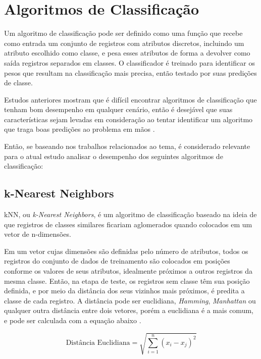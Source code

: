 \section{Algoritmos de Classificação}
\label{sec:algoritmos}

Um algoritmo de classificação pode ser definido como uma função que recebe como entrada um conjunto de registros com atributos discretos, incluindo um atributo escolhido como classe, e pesa esses atributos de forma a devolver como saída registros separados em classes. O classificador é treinado para identificar os pesos que resultam na classificação mais precisa, então testado por suas predições de classe.

Estudos anteriores mostram que é difícil encontrar algoritmos de classificação que tenham bom desempenho em qualquer cenário, então é desejável que suas características sejam levadas em consideração ao tentar identificar um algoritmo que traga boas predições ao problema em mãos \cite{gama-algoritmos}.

Então, se baseando nos trabalhos relacionados ao tema, é considerado relevante para o atual estudo analisar o desempenho dos seguintes algoritmos de classificação:

\subsection{k-Nearest Neighbors}
\label{subsec:contexto-knn}

kNN, ou \textit{k-Nearest Neighbors}, é um algoritmo de classificação baseado na ideia de que registros de classes similares ficariam aglomerados quando colocados em um vetor de n-dimensões.

Em um vetor cujas dimensões são definidas pelo número de atributos, todos os registros do conjunto de dados de treinamento são colocados em posições conforme os valores de seus atributos, idealmente próximos a outros registros da mesma classe. Então, na etapa de teste, os registros sem classe têm sua posição definida, e por meio da distância dos seus vizinhos mais próximos, é predita a classe de cada registro. A distância pode ser euclidiana, \textit{Hamming}, \textit{Manhattan} ou qualquer outra distância entre dois vetores, porém a euclidiana é a mais comum, e pode ser calculada com a equação abaixo \cite{knn}.

\begin{equation}
  \text{Distância Euclidiana} = \sqrt{\sum_{i=1}^{n} (x_i - x_j)^2}
  \end{equation}

